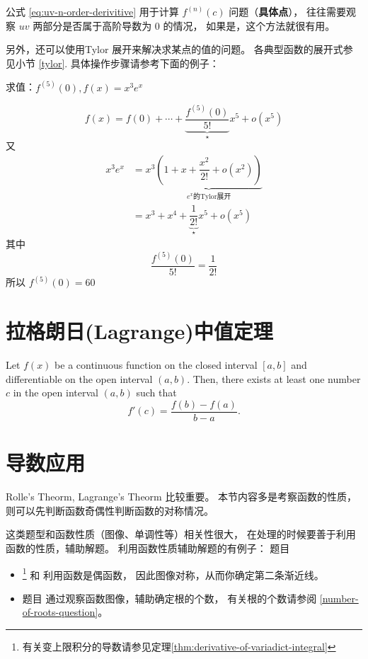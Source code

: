 公式 \ref{eq:uv-n-order-derivitive} 用于计算 $f^{(n)}(c)$ 问题（\textbf{具体点}），
往往需要观察 $uv$ 两部分是否属于高阶导数为 0 的情况，
如果是，这个方法就很有用。

另外，还可以使用Tylor 展开来解决求某点的值的问题。
各典型函数的展开式参见小节 \ref{tylor}.
具体操作步骤请参考下面的例子：
\begin{example}
    求值：$f^{(5)}(0), f(x) = x^3 e^x$

    \[
        f(x) = f(0) + \cdots + \underbrace{\dfrac{f^{(5)}(0)}{5!}}_{\star} x^{5} + o(x^5)
    \]
    又
    \begin{align*}
        x^3 e^x &= x^3 \underbrace{(1+x+\dfrac{x^2}{2!} + o(x^2))}_{e^x\mbox{的Tylor展开}} \\
                &= x^3 + x^4 + \underbrace{\dfrac{1}{2!}}_{\star} x^5 + o(x^5)
    \end{align*}
    其中 
    \[
        \dfrac{f^{(5)}(0)}{5!} = \dfrac{1}{2!}
    \]
    所以 $f^{(5)}(0) = 60$
\end{example}

\section{拉格朗日(Lagrange)中值定理}

\begin{definition}\label{thm:lagrange}
    Let $f(x)$ be a continuous function on the closed interval $[a, b]$ and differentiable on the open interval $(a, b)$. Then, there exists at least one number $c$ in the open interval $(a, b)$ such that
    \[f'(c) = \frac{f(b) - f(a)}{b - a}.\]
\end{definition}

\section{导数应用}

Rolle's Theorm, Lagrange's Theorm 比较重要。
本节内容多是考察函数的性质，则可以先判断函数奇偶性判断函数的对称情况。

这类题型和函数性质（图像、单调性等）相关性很大，
在处理的时候要善于利用函数的性质，辅助解题。
利用函数性质辅助解题的有例子：
题目 
\begin{itemize}

    \item   \cite[page 70, pdf 81, 例1]{we}\footnote{有关变上限积分的导数请参见定理\ref{thm:derivative-of-variadict-integral}} 和 
            \cite[page 75, pdf 86, 例5]{we}利用函数是偶函数，
            因此图像对称，从而你确定第二条渐近线。

    \item   题目 \cite[page 77, pdf 88, 例5, 例6]{we} 
            通过观察函数图像，辅助确定根的个数，
            有关根的个数请参阅 \ref{number-of-roots-question}。

\end{itemize}

